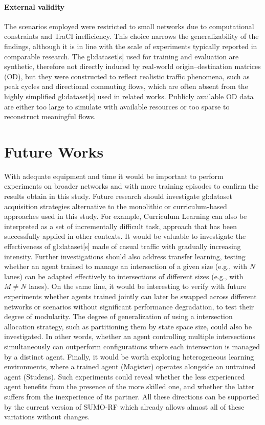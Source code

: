 \paragraph{External validity}

The scenarios employed were restricted to small networks due to computational constraints and TraCI inefficiency.
This choice narrows the generalizability of the findings, although it is in line with the scale of experiments typically reported in comparable research.
The \gls{gl:dataset}[s] used for training and evaluation are synthetic, therefore not directly induced by real-world origin–destination matrices (OD), but they were constructed to reflect realistic traffic phenomena, such as peak cycles and directional commuting flows, which are often absent from the highly simplified \gls{gl:dataset}[s] used in related works.
Publicly available OD data are either too large to simulate with available resources or too sparse to reconstruct meaningful flows.

\section{Future Works}

With adequate equipment and time it would be important to perform experiments on broader networks and with more training episodes to confirm the results obtain in this study.
Future research should investigate \gls{gl:dataset} acquisition strategies alternative to the monolithic or curriculum-based approaches used in this study.
For example, Curriculum Learning can also be interpreted as a set of incrementally difficult task, approach that has been successfully applied in other contexts.
It would be valuable to investigate the effectiveness of \gls{gl:dataset}[s] made of casual traffic with gradually increasing intensity.
Further investigations should also address transfer learning, testing whether an agent trained to manage an intersection of a given size (e.g., with $N$ lanes) can be adapted effectively to intersections of different sizes (e.g., with $M \ne N$ lanes).
On the same line, it would be interesting to verify with future experiments whether agents trained jointly can later be swapped across different networks or scenarios without significant performance degradation, to test their degree of modularity.
The degree of generalization of using a intersection allocation strategy, such as partitioning them by state space size, could also be investigated.
In other words, whether an agent controlling multiple intersections simultaneously can outperform configurations where each intersection is managed by a distinct agent.
Finally, it would be worth exploring heterogeneous learning environments, where a trained agent (Magister) operates alongside an untrained agent (Studens).
Such experiments could reveal whether the less experienced agent benefits from the presence of the more skilled one, and whether the latter suffers from the inexperience of its partner.
All these directions can be supported by the current version of SUMO-RF which already allows almost all of these variations without changes.
